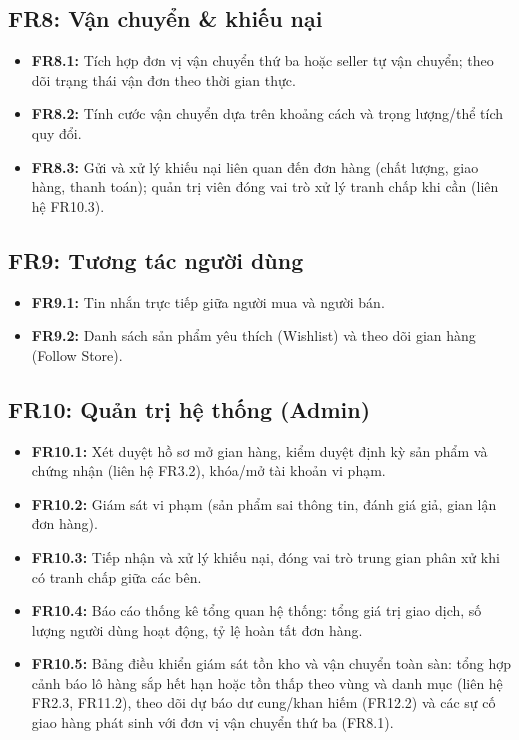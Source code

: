 \subsection{FR8: Vận chuyển \& khiếu nại}
\begin{itemize}
    \item \textbf{FR8.1:} Tích hợp đơn vị vận chuyển thứ ba hoặc seller tự
    vận chuyển; theo dõi trạng thái vận đơn theo thời gian thực.
    \item \textbf{FR8.2:} Tính cước vận chuyển dựa trên khoảng cách và
    trọng lượng/thể tích quy đổi.
    \item \textbf{FR8.3:} Gửi và xử lý khiếu nại liên quan đến đơn hàng
    (chất lượng, giao hàng, thanh toán); quản trị viên đóng vai trò xử lý
    tranh chấp khi cần (liên hệ FR10.3).
\end{itemize}

\subsection{FR9: Tương tác người dùng}
\begin{itemize}
    \item \textbf{FR9.1:} Tin nhắn trực tiếp giữa người mua và người bán.
    \item \textbf{FR9.2:} Danh sách sản phẩm yêu thích (Wishlist) và theo
    dõi gian hàng (Follow Store).
\end{itemize}

\subsection{FR10: Quản trị hệ thống (Admin)}
\begin{itemize}
    \item \textbf{FR10.1:} Xét duyệt hồ sơ mở gian hàng, kiểm duyệt định kỳ
    sản phẩm và chứng nhận (liên hệ FR3.2), khóa/mở tài khoản vi phạm.
    \item \textbf{FR10.2:} Giám sát vi phạm (sản phẩm sai thông tin, đánh
    giá giả, gian lận đơn hàng).
    \item \textbf{FR10.3:} Tiếp nhận và xử lý khiếu nại, đóng vai trò trung
    gian phân xử khi có tranh chấp giữa các bên.
    \item \textbf{FR10.4:} Báo cáo thống kê tổng quan hệ thống: tổng giá trị
    giao dịch, số lượng người dùng hoạt động, tỷ lệ hoàn tất đơn hàng.
    \item \textbf{FR10.5:} Bảng điều khiển giám sát tồn kho và vận chuyển
    toàn sàn: tổng hợp cảnh báo lô hàng sắp hết hạn hoặc tồn thấp theo vùng
    và danh mục (liên hệ FR2.3, FR11.2), theo dõi dự báo dư cung/khan hiếm
    (FR12.2) và các sự cố giao hàng phát sinh với đơn vị vận chuyển thứ ba
    (FR8.1).
\end{itemize}

